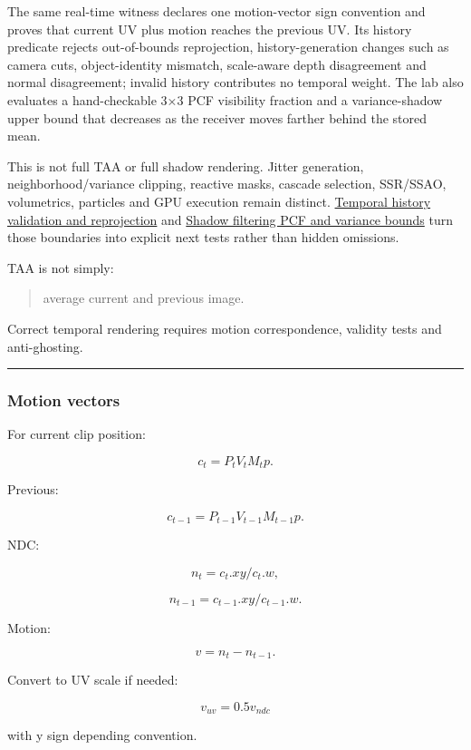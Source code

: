 The same real-time witness declares one motion-vector sign convention and proves that current UV plus motion reaches the previous UV. Its history predicate rejects out-of-bounds reprojection, history-generation changes such as camera cuts, object-identity mismatch, scale-aware depth disagreement and normal disagreement; invalid history contributes no temporal weight. The lab also evaluates a hand-checkable 3×3 PCF visibility fraction and a variance-shadow upper bound that decreases as the receiver moves farther behind the stored mean.

This is not full TAA or full shadow rendering. Jitter generation, neighborhood/variance clipping, reactive masks, cascade selection, SSR/SSAO, volumetrics, particles and GPU execution remain distinct. \hyperref[appendix-e8c352e39466]{Temporal history validation and reprojection} and \hyperref[appendix-7cac8a689849]{Shadow filtering PCF and variance bounds} turn those boundaries into explicit next tests rather than hidden omissions.

TAA is not simply:

\begin{quote}
average current and previous image.
\end{quote}

Correct temporal rendering requires motion correspondence, validity tests and anti-ghosting.

\begin{center}\rule{0.5\linewidth}{0.5pt}\end{center}

\subsubsection{Motion vectors}\label{motion-vectors}

For current clip position:

\[
c_t=
P_tV_tM_tp.
\]

Previous:

\[
c_{t-1}
=
P_{t-1}
V_{t-1}
M_{t-1}
p.
\]

NDC:

\[
n_t=
c_t.xy/c_t.w,
\]

\[
n_{t-1}
=
c_{t-1}.xy/c_{t-1}.w.
\]

Motion:

\[
\boxed{
v=
n_t-n_{t-1}.
}
\]

Convert to UV scale if needed:

\[
v_{uv}=0.5v_{ndc}
\]

with y sign depending convention.

